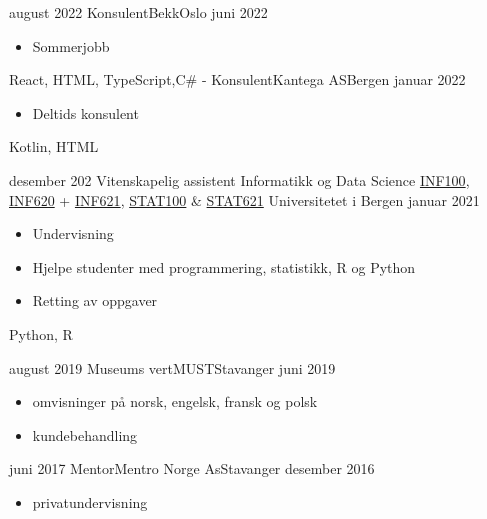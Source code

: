 %
%
%
\begin{experiences}
    \experience
    {august 2022}   {Konsulent}{Bekk}{Oslo}
    {juni 2022} {
                      \begin{itemize}
                        \item Sommerjobb
                      \end{itemize}
                    }
                    {React, HTML, TypeScript,C\# }
  \emptySeparator
  \experience
    {-}   {Konsulent}{Kantega AS}{Bergen}
    {januar 2022} {
                      \begin{itemize}
                        \item Deltids konsulent 
                      \end{itemize}
                    }
                    {Kotlin, HTML}
  \emptySeparator
  
  \experience
    {desember 202}   {Vitenskapelig assistent Informatikk og Data Science }{ \href{https://www.uib.no/emne/INF100}{INF100}, \href{https://www.uib.no/emne/INF620}{INF620} + \href{https://www.uib.no/emne/INF621}{INF621}, \href{https://www.uib.no/emne/STAT100}{STAT100} \& \href{https://www.uib.no/emne/INF621}{STAT621} }{Universitetet i Bergen }
    {januar 2021} {
                      \begin{itemize}
                        \item Undervisning
                        \item Hjelpe studenter med programmering, statistikk, R  og Python
                        \item Retting av oppgaver
                      \end{itemize}
                    }
                    {Python, R}
  \emptySeparator
  
  \simpleexperience
    {august 2019}   {Museums vert}{MUST}{Stavanger}
    {juni 2019} {
                      \begin{itemize}
                        \item omvisninger på norsk, engelsk, fransk og polsk
                        \item kundebehandling
                      \end{itemize}
                    }
                    
  \emptySeparator
  
  \simpleexperience
    {juni 2017}   {Mentor}{Mentro Norge As}{Stavanger}
    {desember 2016} {
                      \begin{itemize}
                        \item privatundervisning
                      \end{itemize}
                    }

  \emptySeparator
  
\end{experiences}
